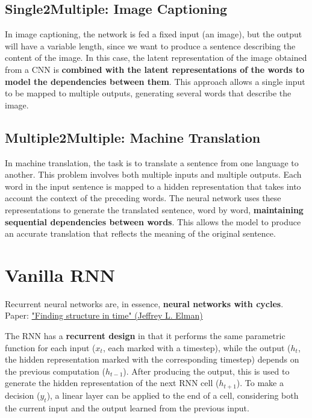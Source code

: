 \subsection{Single2Multiple: Image Captioning}

In image captioning, the network is fed a fixed input (an image), but the output will have a variable length, since we want to produce a sentence describing the content of the image. In this case, the latent representation of the image obtained from a CNN is \textbf{combined with the latent representations of the words to model the dependencies between them}. This approach allows a single input to be mapped to multiple outputs, generating several words that describe the image.

\subsection{Multiple2Multiple: Machine Translation}

In machine translation, the task is to translate a sentence from one language to another. This problem involves both multiple inputs and multiple outputs. Each word in the input sentence is mapped to a hidden representation that takes into account the context of the preceding words. The neural network uses these representations to generate the translated sentence, word by word, \textbf{maintaining sequential dependencies between words}. This allows the model to produce an accurate translation that reflects the meaning of the original sentence.

\section{Vanilla RNN}

Recurrent neural networks are, in essence, \textbf{neural networks with cycles}.\\
Paper: \href{https://www.sciencedirect.com/science/article/pii/036402139090002E}{"Finding structure in time" (Jeffrey L. Elman)}


The RNN has a \textbf{recurrent design} in that it performs the same parametric function for each input ($x_t$, each marked with a timestep), while the output ($h_t$, the hidden representation marked with the corresponding timestep) depends on the previous computation ($h_{t-1}$). After producing the output, this is used to generate the hidden representation of the next RNN cell ($h_{t+1}$). To make a decision ($y_t$), a linear layer can be applied to the end of a cell, considering both the current input and the output learned from the previous input.

